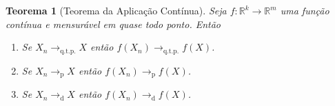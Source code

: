 \documentclass[12pt,a4paper,oneside]{book}
\newtheorem{theorem}{Teorema}[section]
\theoremstyle{definition}
\theoremstyle{remark}
\numberwithin{equation}{section}
\newcommand{\R}{\mathbb{R}}
\begin{document}
\begin{tcolorbox}
\begin{theorem}[Teorema da Aplicação Contínua]\label{teorema aplicacao continua} Seja $f:\R^k\rightarrow \R^m$ uma função contínua e mensurável em quase todo ponto. Então
\begin{enumerate}
\item Se $X_n\rightarrow_{\textrm{q.t.p.}} X$ então $f(X_n)\rightarrow_{\textrm{q.t.p.}} f(X)$.
\item Se $X_n\rightarrow_{\textrm{p}} X$ então $f(X_n)\rightarrow_{\textrm{p}} f(X)$.
\item Se $X_n\rightarrow_{\textrm{d}} X$ então $f(X_n)\rightarrow_{\textrm{d}} f(X)$.
\end{enumerate}
\end{theorem}
\end{tcolorbox}
\end{document}
